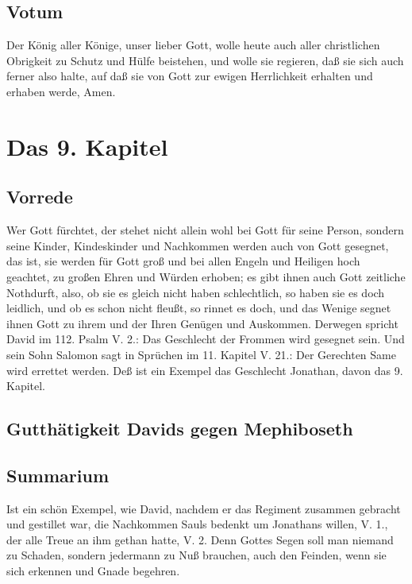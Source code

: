 \section{Votum}

Der König aller Könige, unser lieber Gott, wolle heute auch aller christlichen Obrigkeit zu Schutz und Hülfe beistehen, und wolle sie regieren, daß sie sich auch ferner also halte, auf daß sie von Gott zur ewigen Herrlichkeit erhalten und erhaben werde, Amen.

\chapter{Das 9. Kapitel}

\section{Vorrede}

Wer Gott fürchtet, der stehet nicht allein wohl bei Gott für seine Person, sondern seine Kinder, Kindeskinder und Nachkommen werden auch von Gott gesegnet, das ist, sie werden für Gott groß und bei allen Engeln und Heiligen hoch geachtet, zu großen Ehren und Würden erhoben; es gibt ihnen auch Gott zeitliche Nothdurft, also, ob sie es gleich nicht haben schlechtlich, so haben sie es doch leidlich, und ob es schon nicht fleußt, so rinnet es doch, und das Wenige segnet ihnen Gott zu ihrem und der Ihren Genügen und Auskommen. Derwegen spricht David im 112. Psalm V. 2.: Das Geschlecht der Frommen wird gesegnet sein. Und sein Sohn Salomon sagt in Sprüchen im 11. Kapitel V. 21.: Der Gerechten Same wird errettet werden. Deß ist ein Exempel das Geschlecht Jonathan, davon das 9. Kapitel.

\section{Gutthätigkeit Davids gegen Mephiboseth}

\section{Summarium}

Ist ein schön Exempel, wie David, nachdem er das Regiment zusammen gebracht und gestillet war, die Nachkommen Sauls bedenkt um Jonathans willen, V. 1., der alle Treue an ihm gethan hatte, V. 2. Denn Gottes Segen soll man niemand zu Schaden, sondern jedermann zu Nuß brauchen, auch den Feinden, wenn sie sich erkennen und Gnade begehren.

